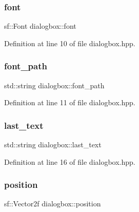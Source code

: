 \subsubsection{\texorpdfstring{font}{font}}
{\footnotesize\ttfamily sf\+::\+Font dialogbox\+::font\hspace{0.3cm}{\ttfamily [private]}}



Definition at line 10 of file dialogbox.\+hpp.

\mbox{\label{classdialogbox_a11fd386b5bb381072262a574ea25c8c3}} 
\subsubsection{\texorpdfstring{font\+\_\+path}{font\_path}}
{\footnotesize\ttfamily std\+::string dialogbox\+::font\+\_\+path\hspace{0.3cm}{\ttfamily [private]}}



Definition at line 11 of file dialogbox.\+hpp.

\mbox{\label{classdialogbox_a227a4bab170830377e3b954c80341570}} 
\subsubsection{\texorpdfstring{last\+\_\+text}{last\_text}}
{\footnotesize\ttfamily std\+::string dialogbox\+::last\+\_\+text}



Definition at line 16 of file dialogbox.\+hpp.

\mbox{\label{classdialogbox_a05031b5d9149389d301638da9005e744}} 
\subsubsection{\texorpdfstring{position}{position}}
{\footnotesize\ttfamily sf\+::\+Vector2f dialogbox\+::position\hspace{0.3cm}{\ttfamily [private]}}



